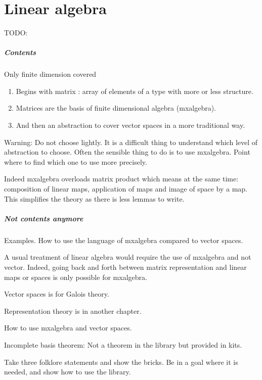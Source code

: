 \chapter{Linear algebra}
\label{linalg:smith}

TODO:

\paragraph{Contents}
Only finite dimension covered

\begin{enumerate}
\item Begins with matrix : array of elements of a type with more or
  less structure.  
\item Matrices are the basis of finite dimensional
  algebra (mxalgebra).
\item   And then an abstraction to cover vector spaces
  in a more traditional way.
\end{enumerate}

Warning: Do not choose lightly. It is a difficult thing to understand
which level of abstraction to choose. Often the sensible thing to do
is to use mxalgebra. Point where to find which one to use more
precisely.

Indeed mxalgebra overloads matrix product which means at the same
time: composition of linear maps, application of maps and image of
space by a map. This simplifies the theory as there is less lemmas to
write.

\paragraph{Not contents anymore}

Examples. How to use the language of mxalgebra compared to vector
spaces.

A usual treatment of linear algebra would require the use of mxalgebra
and not vector. Indeed, going back and forth between matrix
representation and linear maps or spaces is only possible for
mxalgebra.

Vector spaces is for Galois theory.

Representation theory is in another chapter.

How to use mxalgebra and vector spaces.


Incomplete basis theorem: Not a theorem in the library but provided in
kits.

Take three folklore statements and show the bricks. Be in a goal where
it is needed, and show how to use the library.


